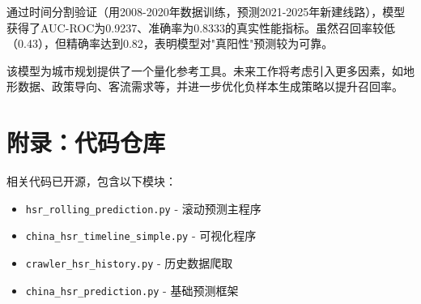 \documentclass[12pt,a4paper]{article}
\begin{document}
通过时间分割验证（用2008-2020年数据训练，预测2021-2025年新建线路），模型获得了AUC-ROC为0.9237、准确率为0.8333的真实性能指标。虽然召回率较低（0.43），但精确率达到0.82，表明模型对"真阳性"预测较为可靠。

该模型为城市规划提供了一个量化参考工具。未来工作将考虑引入更多因素，如地形数据、政策导向、客流需求等，并进一步优化负样本生成策略以提升召回率。

\section*{附录：代码仓库}

相关代码已开源，包含以下模块：
\begin{itemize}
    \item \texttt{hsr\_rolling\_prediction.py} - 滚动预测主程序
    \item \texttt{china\_hsr\_timeline\_simple.py} - 可视化程序
    \item \texttt{crawler\_hsr\_history.py} - 历史数据爬取
    \item \texttt{china\_hsr\_prediction.py} - 基础预测框架
\end{itemize}
\end{document}
